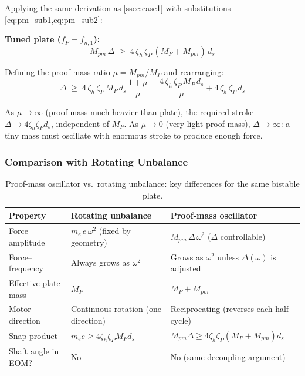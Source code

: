 \documentclass[11pt,letterpaper]{article}
\begin{document}
Applying the same derivation as \cref{ssec:case1} with substitutions
\cref{eq:pm_sub1,eq:pm_sub2}:

\noindent\textbf{Tuned plate ($f_P = f_{n,1}$):}
\begin{equation}
  \boxed{
    M_{pm}\,\Delta \;\geq\; 4\,\zeta_h\,\zeta_P\,(M_P + M_{pm})\,d_s
  }
  \label{eq:pm_snap_tuned}
\end{equation}

Defining the proof-mass ratio $\mu = M_{pm}/M_P$ and rearranging:
\begin{equation}
  \Delta \;\geq\; 4\,\zeta_h\,\zeta_P\,M_P\,d_s\,
    \frac{1 + \mu}{\mu}
  = \frac{4\,\zeta_h\,\zeta_P\,M_P\,d_s}{\mu} + 4\,\zeta_h\,\zeta_P\,d_s
  \label{eq:pm_Delta_min}
\end{equation}

As $\mu \to \infty$ (proof mass much heavier than plate), the required stroke
$\Delta \to 4\zeta_h\zeta_P d_s$, independent of $M_P$.  As $\mu \to 0$ (very
light proof mass), $\Delta \to \infty$: a tiny mass must oscillate with
enormous stroke to produce enough force.

\subsubsection{Comparison with Rotating Unbalance}

\begin{table}[H]
\centering
\caption{Proof-mass oscillator vs.\ rotating unbalance: key differences for
         the same bistable plate.}
\renewcommand{\arraystretch}{1.35}
\small
\begin{tabular}{p{3.0cm} p{4.8cm} p{5.2cm}}
\toprule
\textbf{Property} & \textbf{Rotating unbalance} & \textbf{Proof-mass oscillator} \\
\midrule
Force amplitude      & $m_e\,e\,\omega^2$ (fixed by geometry) & $M_{pm}\,\Delta\,\omega^2$ ($\Delta$ controllable) \\
Force--frequency     & Always grows as $\omega^2$              & Grows as $\omega^2$ unless $\Delta(\omega)$ is adjusted \\
Effective plate mass & $M_P$                                   & $M_P + M_{pm}$ \\
Motor direction      & Continuous rotation (one direction)     & Reciprocating (reverses each half-cycle) \\
Snap product         & $m_e e \geq 4\zeta_h\zeta_P M_P d_s$   & $M_{pm}\Delta \geq 4\zeta_h\zeta_P(M_P+M_{pm})d_s$ \\
Shaft angle in EOM?  & No                                      & No (same decoupling argument) \\
\bottomrule
\end{tabular}
\label{tab:pm_vs_ru}
\end{table}
\end{document}
